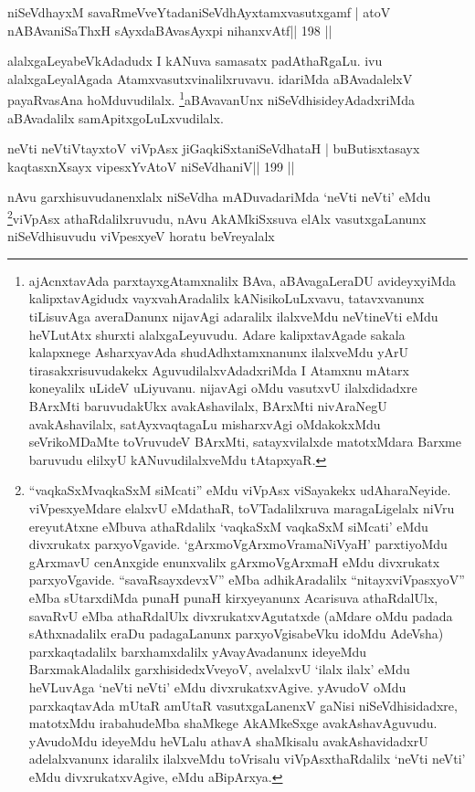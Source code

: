 \begin{shl}
niSeVdhayxM savaRmeVveYtadaniSeVdhAyxtamxvasutxgamf |
atoV nABAvaniSaThxH sAyxdaBAvasAyxpi nihanxvAtf\hfill || 198 ||
\end{shl}

\begin{artha}
alalxgaLeyabeVkAdadudx I kANuva samasatx padAthaRgaLu. ivu
alalxgaLeyalAgada
Atamxvasutxvinalilxruvavu. idariMda aBAvadalelxV payaRvasAna 
hoMduvudilalx. \footnote{ajAcnxtavAda
  parxtayxgAtamxnalilx BAva, aBAvagaLeraDU avideyxyiMda
  kalipxtavAgidudx vayxvahAradalilx kANisikoLuLxvavu, tatavxvanunx
  tiLisuvAga averaDanunx nijavAgi adaralilx ilalxveMdu neVtineVti eMdu
heVLutAtx shurxti alalxgaLeyuvudu. Adare kalipxtavAgade
sakala kalapxnege AsharxyavAda shudAdhxtamxnanunx ilalxveMdu yArU
tirasakxrisuvudakekx AguvudilalxvAdadxriMda I Atamxnu mAtarx
koneyalilx uLideV uLiyuvanu. nijavAgi oMdu vasutxvU ilalxdidadxre
BArxMti baruvudakUkx avakAshavilalx, BArxMti nivAraNegU
avakAshavilalx, satAyxvaqtagaLu misharxvAgi oMdakokxMdu seVrikoMDaMte
toVruvudeV BArxMti, satayxvilalxde matotxMdara Barxme baruvudu elilxyU
kANuvudilalxveMdu tAtapxyaR.}aBAvavanUnx niSeVdhisideyAdadxriMda aBAvadalilx samApitxgoLuLxvudilalx.
\end{artha}


\begin{shl}
neVti neVtiVtayxtoV viVpAsx jiGaqkiSxtaniSeVdhataH |
buButisxtasayx kaqtasxnXsayx vipesxYvAtoV niSeVdhaniV\hfill || 199 ||
\end{shl}

\begin{artha}
nAvu garxhisuvudanenxlalx niSeVdha mADuvadariMda `neVti neVti'
eMdu \footnote{``vaqkaSxMvaqkaSxM siMcati'' eMdu viVpAsx viSayakekx
  udAharaNeyide. viVpesxyeMdare elalxvU eMdathaR, toVTadalilxruva
  maragaLigelalx niVru ereyutAtxne eMbuva athaRdalilx `vaqkaSxM
  vaqkaSxM siMcati' eMdu divxrukatx parxyoVgavide.
  `gArxmoVgArxmoVramaNiVyaH' parxtiyoMdu gArxmavU cenAnxgide
  enunxvalilx gArxmoVgArxmaH eMdu divxrukatx parxyoVgavide.
  ``savaRsayxdevxV'' eMba adhikAradalilx ``nitayxviVpasxyoV'' eMba
  sUtarxdiMda punaH punaH kirxyeyanunx Acarisuva athaRdalUlx, savaRvU
  eMba athaRdalUlx divxrukatxvAgutatxde (aMdare oMdu padada
  sAthxnadalilx eraDu padagaLanunx parxyoVgisabeVku idoMdu AdeVsha)
  parxkaqtadalilx barxhamxdalilx yAvayAvadanunx ideyeMdu
  BarxmakAladalilx garxhisidedxVveyoV, avelalxvU `ilalx ilalx' eMdu
  heVLuvAga `neVti neVti' eMdu divxrukatxvAgive. yAvudoV oMdu
  parxkaqtavAda mUtaR amUtaR vasutxgaLanenxV gaNisi niSeVdhisidadxre,
  matotxMdu irabahudeMba shaMkege AkAMkeSxge avakAshavAguvudu.
  yAvudoMdu ideyeMdu heVLalu athavA shaMkisalu avakAshavidadxrU
  adelalxvanunx idaralilx ilalxveMdu toVrisalu viVpAsxthaRdalilx `neVti
  neVti' eMdu divxrukatxvAgive, eMdu aBipArxya.}viVpAsx athaRdalilxruvudu, nAvu AkAMkiSxsuva elAlx
vasutxgaLanunx niSeVdhisuvudu viVpesxyeV horatu beVreyalalx
\end{artha}

